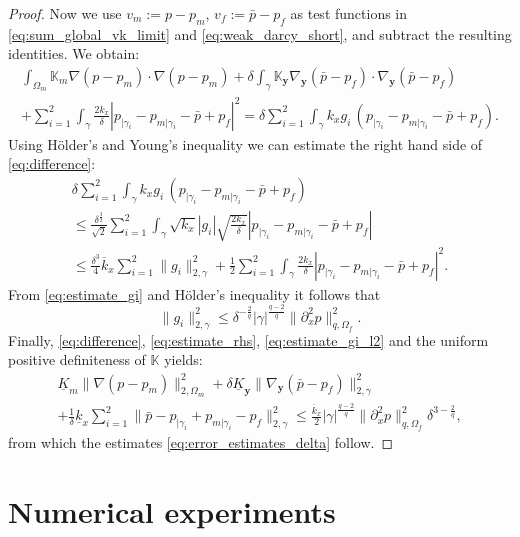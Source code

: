 \documentclass{llncs}
\def\prtl{\partial}
\def\vc#1{\mathbf{\boldsymbol{#1}}}     %
\def\tn#1{{\mathbb{#1}}}    %
\def\norm#1{\|#1\|}
\def\yy{{\vc y}}
\begin{document}
\begin{proof}
Now we use $v_m:=p-p_m$, $v_f:=\bar p-p_f$ as test functions in \eqref{eq:sum_global_vk_limit} and \eqref{eq:weak_darcy_short}, and subtract the resulting identities.
We obtain:
\begin{multline}
\label{eq:difference}
\int_{\Omega_m}\tn K_m\nabla(p-p_m)\cdot\nabla(p-p_m)
+ \delta\int_\gamma\tn K_\yy\nabla_\yy(\bar p-p_f)\cdot\nabla_\yy(\bar p-p_f)\\
+ \sum_{i=1}^2\int_{\gamma} \frac{2k_x}\delta |p_{|\gamma_i} - p_{m|\gamma_i} - \bar p + p_f|^2
= \delta\sum_{i=1}^2\int_\gamma k_x g_i\, (p_{|\gamma_i}-p_{m|\gamma_i} - \bar p + p_f).
\end{multline}
Using H\"older's and Young's inequality we can estimate the right hand side of \eqref{eq:difference}:
\begin{multline}
\label{eq:estimate_rhs}
\delta\sum_{i=1}^2\int_\gamma k_x g_i\, (p_{|\gamma_i}-p_{m|\gamma_i} - \bar p + p_f)\\
\le \frac{\delta^{\frac32}}{\sqrt2}\sum_{i=1}^2\int_\gamma \sqrt{k_x}|g_i|\sqrt{\frac{2k_x}\delta}|p_{|\gamma_i}-p_{m|\gamma_i} - \bar p + p_f|\\
\le \frac{\delta^3}4\overline k_x\sum_{i=1}^2\norm{g_i}_{2,\gamma}^2 + \frac12\sum_{i=1}^2\int_\gamma \frac{2k_x}\delta |p_{|\gamma_i}-p_{m|\gamma_i} - \bar p + p_f|^2.
\end{multline}
From \eqref{eq:estimate_gi} and H\"older's inequality it follows that
\begin{equation}
\label{eq:estimate_gi_l2}
\norm{g_i}_{2,\gamma}^2 \le \delta^{-\frac2q}|\gamma|^{\frac{q-2}q}\norm{\prtl_x^2 p}_{q,\Omega_f}^2.
\end{equation}
Finally, \eqref{eq:difference}, \eqref{eq:estimate_rhs}, \eqref{eq:estimate_gi_l2} and the uniform positive definiteness of $\tn K$ yields:
\begin{multline}
\underline K_m\norm{\nabla (p-p_m)}_{2,\Omega_m}^2
+\delta\underline K_\yy\norm{\nabla_\yy(\bar p-p_f)}_{2,\gamma}^2\\
+ \frac1\delta\underline k_x\sum_{i=1}^2\norm{\bar p - p_{|\gamma_i} + p_{m|\gamma_i} - p_f}_{2,\gamma}^2
\le \frac{\overline k_x}2|\gamma|^{\frac{q-2}q}\norm{\partial_x^2 p}_{q,\Omega_f}^2\delta^{3-\frac2q},
\end{multline}
from which the estimates \eqref{eq:error_estimates_delta} follow.
\end{proof}




\section{Numerical experiments}
\label{sc:numerics}
\end{document}
